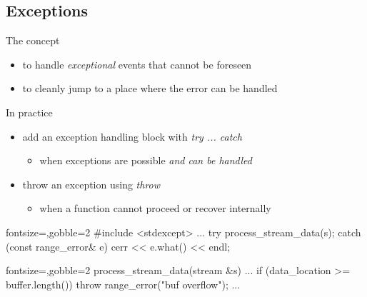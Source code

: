 \subsection[except]{Exceptions}

\begin{frame}[fragile]
  \begin{block}{The concept}
    \begin{itemize}
      \item to handle \textit{exceptional} events that cannot be foreseen
      \item to cleanly jump to a place where the error can be handled
    \end{itemize}
  \end{block}
  \begin{block}{In practice}
    \begin{itemize}
      \item add an exception handling block with {\it try ... catch} 
      \begin{itemize}
        \item when exceptions are possible \textit{and can be handled}
      \end{itemize}
      \item throw an exception using {\it throw}
      \begin{itemize}
        \item when a function cannot proceed or recover internally
      \end{itemize}
    \end{itemize}
  \end{block}
  \begin{multicols}{2}
    \begin{cppcode*}{fontsize=\scriptsize,gobble=2}
      #include <stdexcept>
      ...
      try {
        process_stream_data(s);
      } catch (const range_error& e) {
        cerr << e.what() << endl;
      }
    \end{cppcode*}
    \columnbreak
    \begin{cppcode*}{fontsize=\scriptsize,gobble=2}
      process_stream_data(stream &s) {
        ...
        if (data_location >= buffer.length()) {
          throw range_error("buf overflow");
        }
        ...
      }
    \end{cppcode*}
  \end{multicols}
\end{frame}

